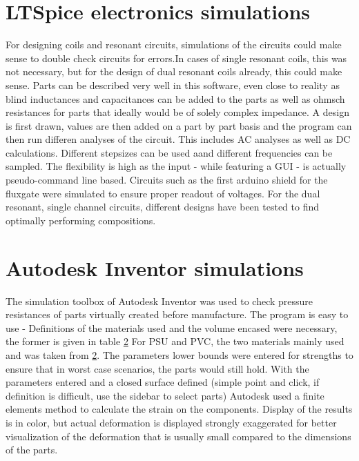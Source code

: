     \section{LTSpice electronics simulations}
        For designing coils and resonant circuits, simulations of the circuits could make sense to double check circuits for errors.In cases of single resonant coils, this was not necessary, but for the design of dual resonant coils already, this could make sense. Parts can be described very well in this software, even close to reality as blind inductances and capacitances can be added to the parts as well as ohmsch resistances for parts that ideally would be of solely complex impedance.
        A design is first drawn, values are then added on a part by part basis and the program can then run differen analyses of the circuit. This includes AC analyses as well as DC calculations. Different stepsizes can be used aand different frequencies can be sampled. The flexibility is high as the input - while featuring a GUI - is actually pseudo-command line based. Circuits such as the first arduino shield for the fluxgate were simulated to ensure proper readout of voltages. For the dual resonant, single channel circuits, different designs have been tested to find optimally performing compositions.
    \section{Autodesk Inventor simulations}
        The simulation toolbox of Autodesk Inventor was used to check pressure resistances of parts virtually created before manufacture. The program is easy to use - Definitions of the materials used and the volume encased were necessary, the former is given in table \ref{} For PSU and PVC, the two materials mainly used and was taken from \ref{}. The parameters lower bounds were entered for strengths to ensure that in worst case scenarios, the parts would still hold. With the parameters entered and a closed surface defined (simple point and click, if definition is difficult, use the sidebar to select parts) Autodesk used a finite elements method to calculate the strain on the components. Display of the results is in color, but actual deformation is displayed strongly exaggerated for better visualization of the deformation that is usually small compared to the dimensions of the parts.
